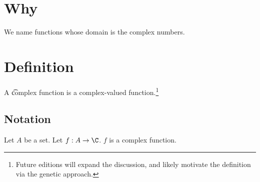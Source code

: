 
\section*{Why}

We name functions whose domain is the complex numbers.

\section*{Definition}

A \t{complex function} is a complex-valued function.\footnote{Future editions will expand the discussion, and likely motivate the definition via the genetic approach.}

\subsection*{Notation}

Let $A$ be a set.
Let $f: A \to \C $.
$f$ is a complex function.

\blankpage